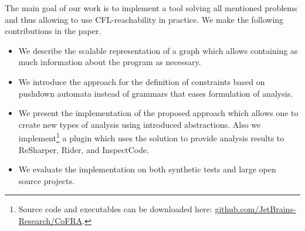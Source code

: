 The main goal of our work is to implement a tool solving all mentioned problems and thus allowing to use CFL-reachability in practice.
We make the following contributions in the paper.
\begin{itemize}
	\item We describe the scalable representation of a graph which allows containing as much information about the program as necessary.
	\item We introduce the approach for the definition of constraints based on pushdown automata instead of grammars that eases formulation of analysis.
	\item We present the implementation of the proposed approach which allows one to create new types of analysis using introduced abstractions.
	Also we implement\footnote{Source code and executables can be downloaded here: \url{github.com/JetBrains-Research/CoFRA}.} a plugin which uses the solution to provide analysis results to ReSharper, Rider, and InspectCode.
	\item We evaluate the implementation on both synthetic tests and large open source projects.
\end{itemize}
